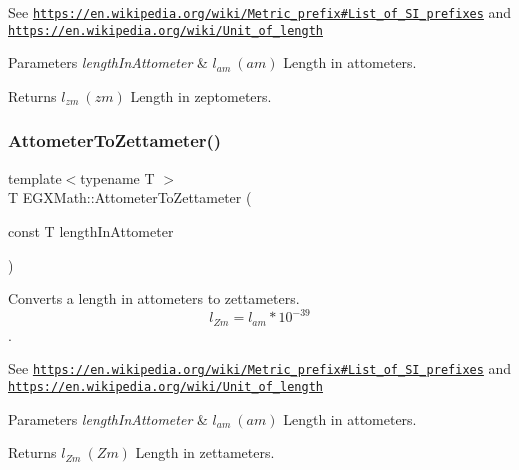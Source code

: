 See \href{https://en.wikipedia.org/wiki/Metric_prefix#List_of_SI_prefixes}{\tt https\+://en.\+wikipedia.\+org/wiki/\+Metric\+\_\+prefix\#\+List\+\_\+of\+\_\+\+S\+I\+\_\+prefixes} and \href{https://en.wikipedia.org/wiki/Unit_of_length}{\tt https\+://en.\+wikipedia.\+org/wiki/\+Unit\+\_\+of\+\_\+length} 
\begin{DoxyParams}{Parameters}
{\em length\+In\+Attometer} & $ l_{am}\ (am)$ Length in attometers. \\
\hline
\end{DoxyParams}
\begin{DoxyReturn}{Returns}
$ l_{zm}\ (zm)$ Length in zeptometers. 
\end{DoxyReturn}
\mbox{\label{group___e_g_x_math-_conversions-_length_conversions-_attometer-_s_i_ga64b586463e4d2d7bbc63e43e8205383b}} 
\subsubsection{\texorpdfstring{Attometer\+To\+Zettameter()}{AttometerToZettameter()}}
{\footnotesize\ttfamily template$<$typename T $>$ \\
T E\+G\+X\+Math\+::\+Attometer\+To\+Zettameter (\begin{DoxyParamCaption}\item[{const T}]{length\+In\+Attometer }\end{DoxyParamCaption})}



Converts a length in attometers to zettameters. \[ l_{Zm}=l_{am} * 10^{-39} \]. 

See \href{https://en.wikipedia.org/wiki/Metric_prefix#List_of_SI_prefixes}{\tt https\+://en.\+wikipedia.\+org/wiki/\+Metric\+\_\+prefix\#\+List\+\_\+of\+\_\+\+S\+I\+\_\+prefixes} and \href{https://en.wikipedia.org/wiki/Unit_of_length}{\tt https\+://en.\+wikipedia.\+org/wiki/\+Unit\+\_\+of\+\_\+length} 
\begin{DoxyParams}{Parameters}
{\em length\+In\+Attometer} & $ l_{am}\ (am)$ Length in attometers. \\
\hline
\end{DoxyParams}
\begin{DoxyReturn}{Returns}
$ l_{Zm}\ (Zm)$ Length in zettameters. 
\end{DoxyReturn}

